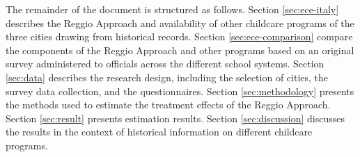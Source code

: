 The remainder of the document is structured as follows. Section \ref{sec:ece-italy} describes the Reggio Approach and availability of other childcare programs of the three cities drawing from historical records. Section \ref{sec:ece-comparison} compare the components of the Reggio Approach and other programs based on an original survey administered to officials across the different school systems. Section \ref{sec:data} describes the research design, including the selection of cities, the survey data collection, and the questionnaires. Section \ref{sec:methodology} presents the methods used to estimate the treatment effects of the Reggio Approach. Section \ref{sec:result} presents estimation results. Section \ref{sec:discussion} discusses the results in the context of historical information on different childcare programs. 


